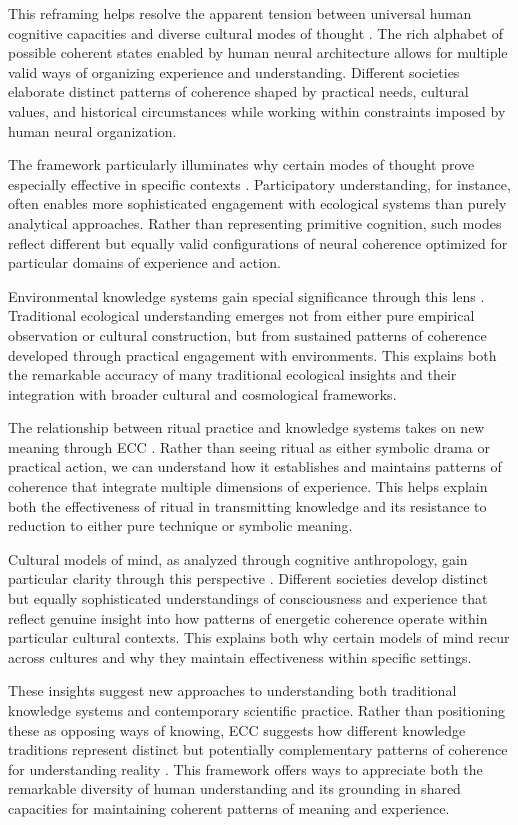 This reframing helps resolve the apparent tension between universal human cognitive capacities and diverse cultural modes of thought \cite{sperber1996explaining}. The rich alphabet of possible coherent states enabled by human neural architecture allows for multiple valid ways of organizing experience and understanding. Different societies elaborate distinct patterns of coherence shaped by practical needs, cultural values, and historical circumstances while working within constraints imposed by human neural organization.

The framework particularly illuminates why certain modes of thought prove especially effective in specific contexts \cite{rappaport1984pigs}. Participatory understanding, for instance, often enables more sophisticated engagement with ecological systems than purely analytical approaches. Rather than representing primitive cognition, such modes reflect different but equally valid configurations of neural coherence optimized for particular domains of experience and action.

Environmental knowledge systems gain special significance through this lens \cite{bateson1979mind}. Traditional ecological understanding emerges not from either pure empirical observation or cultural construction, but from sustained patterns of coherence developed through practical engagement with environments. This explains both the remarkable accuracy of many traditional ecological insights and their integration with broader cultural and cosmological frameworks.

The relationship between ritual practice and knowledge systems takes on new meaning through ECC \cite{turner1982ritual}. Rather than seeing ritual as either symbolic drama or practical action, we can understand how it establishes and maintains patterns of coherence that integrate multiple dimensions of experience. This helps explain both the effectiveness of ritual in transmitting knowledge and its resistance to reduction to either pure technique or symbolic meaning.

Cultural models of mind, as analyzed through cognitive anthropology, gain particular clarity through this perspective \cite{boyer2001religion}. Different societies develop distinct but equally sophisticated understandings of consciousness and experience that reflect genuine insight into how patterns of energetic coherence operate within particular cultural contexts. This explains both why certain models of mind recur across cultures and why they maintain effectiveness within specific settings.

These insights suggest new approaches to understanding both traditional knowledge systems and contemporary scientific practice. Rather than positioning these as opposing ways of knowing, ECC suggests how different knowledge traditions represent distinct but potentially complementary patterns of coherence for understanding reality \cite{laughlin1992brain}. This framework offers ways to appreciate both the remarkable diversity of human understanding and its grounding in shared capacities for maintaining coherent patterns of meaning and experience.